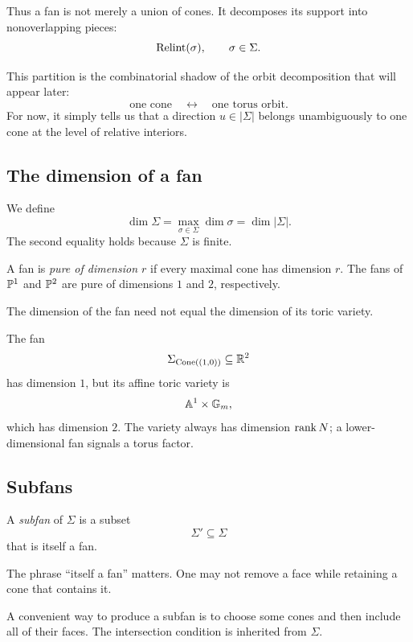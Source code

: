 Thus a fan is not merely a union of cones. It decomposes its support
into nonoverlapping pieces:
\[
\operatorname{Relint}(\sigma),
\qquad
\sigma\in\Sigma.
\]

\begin{observation}
This partition is the combinatorial shadow of the orbit decomposition
that will appear later:
\[
\text{one cone}
\quad\longleftrightarrow\quad
\text{one torus orbit}.
\]
For now, it simply tells us that a direction \(u\in|\Sigma|\) belongs
unambiguously to one cone at the level of relative interiors.
\end{observation}

\subsection{The dimension of a fan}

We define
\[
\dim\Sigma
=
\max_{\sigma\in\Sigma}\dim\sigma
=
\dim|\Sigma|.
\]
The second equality holds because \(\Sigma\) is finite.

A fan is \emph{pure of dimension \(r\)} if every maximal cone has
dimension \(r\). The fans of \(\mathbb{P}^1\) and \(\mathbb{P}^2\) are pure of
dimensions \(1\) and \(2\), respectively.

\begin{warningbox}
The dimension of the fan need not equal the dimension of its toric
variety.

The fan
\[
\Sigma_{\operatorname{Cone}((1,0))}\subseteq\mathbb{R}^2
\]
has dimension \(1\), but its affine toric variety is
\[
\mathbb{A}^1\times\mathbb{G}_{m},
\]
which has dimension \(2\). The variety always has dimension
\(\operatorname{rank} N\); a lower-dimensional fan signals a torus factor.
\end{warningbox}

\subsection{Subfans}

\begin{definition}
A \emph{subfan} of \(\Sigma\) is a subset
\[
\Sigma'\subseteq\Sigma
\]
that is itself a fan.
\end{definition}

The phrase “itself a fan” matters. One may not remove a face while
retaining a cone that contains it.

A convenient way to produce a subfan is to choose some cones and then
include all of their faces. The intersection condition is inherited
from \(\Sigma\).

